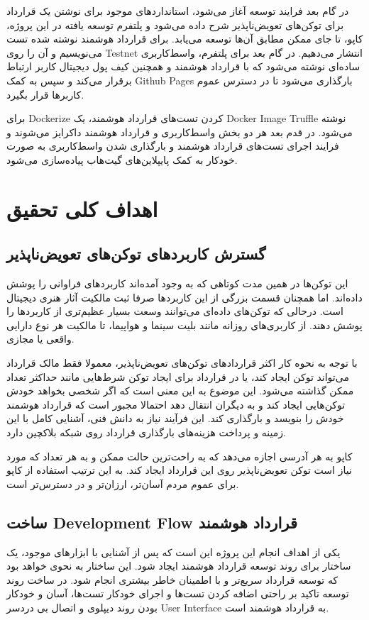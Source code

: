 در گام بعد فرایند توسعه آغاز می‌شود،
استاندارد‌های موجود برای نوشتن یک قرارداد برای توکن‌های تعویض‌ناپذیر شرح داده می‌شود و
پلتفرم توسعه یافته در این پروژه، کاپو، تا جای ممکن مطابق آن‌ها توسعه می‌یابد.
برای قرارداد هوشمند نوشته شده تست می‌نویسیم و آن را روی
\gls{Testnet}
انتشار می‌دهیم.
در گام بعد برای پلتفرم،
واسط‌کاربری ساده‌ای نوشته می‌شود که با قرارداد هوشمند و
همچنین کیف پول دیجیتال کاربر ارتباط برقرار می‌کند و سپس به کمک
\gls{Github Pages}
بارگذاری می‌شود تا در دسترس عموم کاربرها قرار بگیرد.

برای
\gls{Dockerize}
کردن تست‌های قرارداد هوشمند، یک
\gls{Docker Image}
\gls{Truffle}
نوشته می‌شود.
در قدم بعد هر دو بخش واسط‌کاربری و قرارداد هوشمند داکرایز می‌شوند
و فرایند اجرای تست‌های قرارداد هوشمند
و بارگذاری شدن واسط‌کاربری به صورت خودکار به کمک پایپلاین‌های گیت‌هاب پیاده‌سازی می‌شود.


\section{اهداف کلی تحقیق}
\subsection{گسترش کاربرد‌های توکن‌های تعویض‌ناپذیر}
این توکن‌ها در همین مدت کوتاهی که به وجود آمده‌اند کاربردهای فراوانی را پوشش داده‌اند.
اما همچنان قسمت بزرگی از این کاربردها صرفا ثبت مالکیت آثار هنری دیجیتال است.
درحالی که توکن‌های داده‌ای می‌توانند وسعت بسیار عظیم‌تری از کاربردها را پوشش دهند.
از کاربری‌های روزانه مانند بلیت سینما و هواپیما، تا مالکیت هر نوع دارایی واقعی یا مجازی.

با توجه به نحوه کار اکثر قراردادهای توکن‌های تعویض‌ناپذیر،
معمولا فقط مالک قرارداد می‌تواند توکن ایجاد کند،
یا در قرارداد برای ایجاد توکن شرط‌هایی مانند حداکثر تعداد ممکن گذاشته می‌شود.
این موضوع به این معنی است که اگر شخصی بخواهد خودش توکن‌هایی ایجاد کند
و به دیگران انتقال دهد احتمالا مجبور است که قرارداد هوشمند خودش را بنویسد و بارگذاری کند.
این فرآیند نیاز به دانش فنی، آشنایی کامل با این زمینه و پرداخت هزینه‌های بارگذاری قرارداد روی شبکه بلاکچین دارد.

کاپو به هر آدرسی اجازه می‌دهد که به راحت‌ترین حالت ممکن
و به هر تعداد که مورد نیاز است توکن تعویض‌ناپذیر روی این قرارداد ایجاد کند.
به این ترتیب استفاده از کاپو برای عموم مردم آسان‌تر، ارزان‌تر و در دسترس‌تر است.


\subsection{ساخت
\gls{Development Flow}
قرارداد هوشمند}
یکی از اهداف انجام این پروژه این است که پس از آشنایی با ابزارهای موجود،
یک ساختار برای روند توسعه قرارداد هوشمند ایجاد شود.
این ساختار به نحوی خواهد بود که توسعه قرارداد سریع‌تر و با اطمینان خاطر بیشتری انجام شود.
در ساخت روند توسعه تاکید بر راحتی اضافه کردن تست‌ها و اجرای خودکار تست‌ها،
آسان و خودکار بودن روند دیپلوی و اتصال بی دردسر
\gls{User Interface}
به قرارداد هوشمند است.


